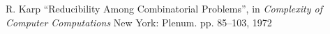 \documentclass[journal]{IEEEtran}
\begin{document}
\begin{thebibliography}{10}
    
  
    R. Karp ``Reducibility Among Combinatorial Problems'', in 
    \emph{Complexity of Computer Computations} New York: Plenum. pp. 85–103, 1972
    
   \end{thebibliography}
   
   
   
\end{document}

